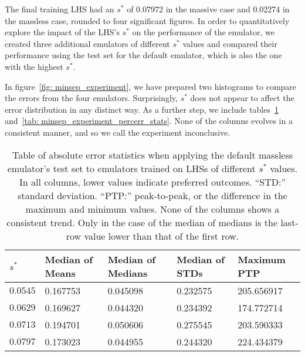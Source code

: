 The final training LHS had an $s^*$ of 0.07972 in the massive case and 
0.02274 in the massless case, rounded to four significant figures. In order
to quantitatively explore the impact of the LHS's $s^*$ on the performance
of the emulator, we created three additional emulators of different $s^*$
values and compared their performance using the test set for the default
emulator, which is also the one with the highest $s^*$.

In figure~\ref{fig: minsep_experiment}, we have prepared two histograms to
compare the errors from the four emulators. Surprisingly, $s^*$ does not
appear to affect the error distribution in any distinct way. As a further
step, we include tables~\ref{tab: minsep_experiment_delta_stats}
and~\ref{tab: minsep_experiment_percerr_stats}. None of the columns evolves
in a consistent manner, and so we call the experiment inconclusive.

\begin{table}[ht!]
\centering
\begin{tabular}{l|l|l|l|l}
\hline
$s^*$ & Median of Means & Median of Medians & Median of STDs & Maximum PTP \\ \hline
$0.0545$ & 0.167753 & 0.045098 & 0.232575 & 205.656917 \\
$0.0629$ & 0.169627 & 0.044320 & 0.234392 & 174.772714 \\
$0.0713$ & 0.194701 & 0.050606 & 0.275545 & 203.590333 \\
$0.0797$ & 0.173023 & 0.044955 & 0.244320 & 224.434379 \\
\end{tabular}
	\cprotect\caption[$s^*$ Experiment: Percent Error Statistics]{Table of
		absolute error statistics
		when applying the default massless emulator's test
		set to emulators trained on LHSs of different $s^*$ values. In all
		columns, lower values indicate preferred outcomes. ``STD:'' standard
		deviation. ``PTP:'' peak-to-peak, or the difference in the maximum
		and minimum values. None of the columns shows a consistent trend.
		Only in the case of the median of medians is the last-row value
		lower than that of the first row.}
 \label{tab: minsep_experiment_delta_stats}
\end{table}


